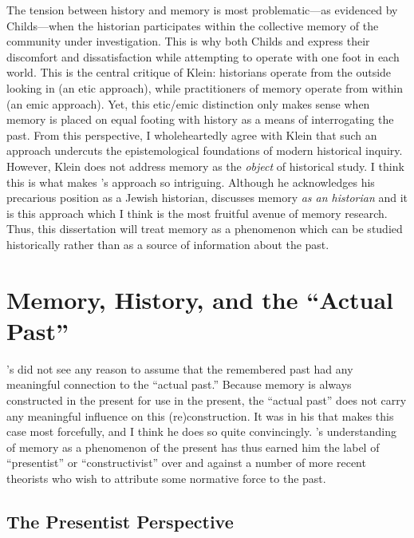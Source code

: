 The tension between history and memory is most problematic---as evidenced by Childs---when the historian participates within the collective memory of the community under investigation. This is why both Childs and \yerushalmi express their discomfort and dissatisfaction while attempting to operate with one foot in each world. This is the central critique of Klein: historians operate from the outside looking in (an etic approach), while practitioners of memory operate from within (an emic approach). Yet, this etic/emic distinction only makes sense when memory is placed on equal footing with history as a means of interrogating the past. From this perspective, I wholeheartedly agree with Klein that such an approach undercuts the epistemological foundations of modern historical inquiry. However, Klein does not address memory as the \emph{object} of historical study. I think this is what makes \yerushalmi's approach so intriguing. Although he acknowledges his precarious position as a Jewish historian, \yerushalmi discusses memory \emph{as an historian} and it is this approach which I think is the most fruitful avenue of memory research. Thus, this dissertation will treat memory as a phenomenon which can be studied historically rather than as a source of information about the past.

\section{Memory, History, and the ``Actual Past''}

\halbwachs's did not see any reason to assume that the remembered past had any meaningful connection to the ``actual past.'' Because memory is always constructed in the present for use in the present, the ``actual past'' does not carry any meaningful influence on this (re)construction. It was in his  that \halbwachs makes this case most forcefully, and I think he does so quite convincingly. \halbwachs's understanding of memory as a phenomenon of the present has thus earned him the label of ``presentist'' or ``constructivist'' over and against a number of more recent theorists who wish to attribute some normative force to the past.%
    \autocite[27--30]{coser_halbwachs1992}  

\subsection{The Presentist Perspective}  

